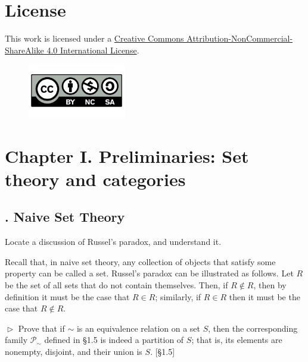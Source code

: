 \documentclass[12pt,letterpaper,boxed]{hmcpset}
\begin{document}
\section*{License}
This work is licensed under a \href{http://creativecommons.org/licenses/by-nc-sa/4.0/}{Creative Commons Attribution-NonCommercial-ShareAlike 4.0 International License}.
\vfill
\begin{figure}[h]
	\centering\includegraphics[width=0.38\textwidth]{./BY-NC-SA}
\end{figure}

\newpage

\section{Chapter I.\hspace{0.2em} Preliminaries: Set theory and categories}

\subsection{. Naive Set Theory}

\begin{problem}[1.1]
	Locate a discussion of Russel's paradox, and understand it.
\end{problem}
\begin{solution}
	Recall that, in naive set theory, any collection of objects
	that satisfy some property can be called a set. Russel's paradox can be
	illustrated as follows.  Let $R$ be the set of all sets that do not contain
	themselves. Then, if $R\notin R$, then by definition it must be the case that
	$R\in R$; similarly, if $R\in R$ then it must be the case that $R\notin R$.
\end{solution}

\hypertarget{Exercise I.1.2}{}
\begin{problem}[1.2]
	$\vartriangleright$ Prove that if $\sim$ is an equivalence relation on a set $S$, then
	the corresponding family $\mathscr{P}_{\sim}$ defined in \S1.5 is indeed a
	partition of $S$; that is, its elements are nonempty, disjoint, and their union
	is $S$. [\S1.5]
\end{problem}
\end{document}
